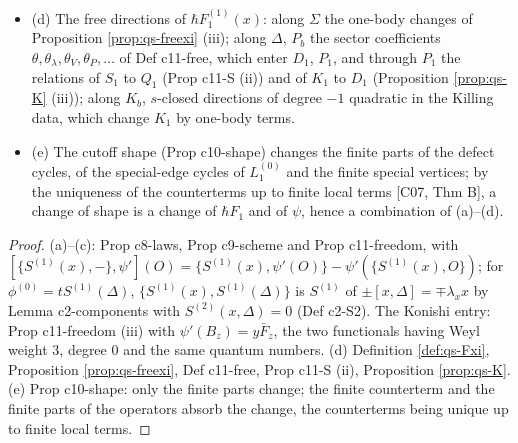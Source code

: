 \begin{proposition}
\begin{itemize}
\item (d) The free directions of $\hbar F_1^{(1)}(x)$: along $\Sigma$ the one-body changes of Proposition \ref{prop:qs-freexi} (iii); along $\Delta$, $P_b$ the sector coefficients $\theta,\theta_\lambda,\theta_V,\theta_P,\dots$ of Def c11-free, which enter $D_1$, $P_1$, and through $P_1$ the relations of $S_1$ to $Q_1$ (Prop c11-S (ii)) and of $K_1$ to $D_1$ (Proposition \ref{prop:qs-K} (iii)); along $K_b$, $s$-closed directions of degree $-1$ quadratic in the Killing data, which change $K_1$ by one-body terms.
\item (e) The cutoff shape (Prop c10-shape) changes the finite parts of the defect cycles, of the special-edge cycles of $L_1^{(0)}$ and the finite special vertices; by the uniqueness of the counterterms up to finite local terms [C07, Thm B], a change of shape is a change of $\hbar F_1$ and of $\psi$, hence a combination of (a)--(d).
\end{itemize}
\end{proposition}

\begin{proof}
(a)--(c): Prop c8-laws, Prop c9-scheme and Prop c11-freedom, with $[\{S^{(1)}(x),-\},\psi'](O)=\{S^{(1)}(x),\psi'(O)\}-\psi'(\{S^{(1)}(x),O\})$; for $\phi^{(0)}=tS^{(1)}(\Delta)$, $\{S^{(1)}(x),S^{(1)}(\Delta)\}$ is $S^{(1)}$ of $\pm[x,\Delta]=\mp\lambda_xx$ by Lemma c2-components with $S^{(2)}(x,\Delta)=0$ (Def c2-S2). The Konishi entry: Prop c11-freedom (iii) with $\psi'(B_z)=y\bar F_z$, the two functionals having Weyl weight $3$, degree $0$ and the same quantum numbers. (d) Definition \ref{def:qs-Fxi}, Proposition \ref{prop:qs-freexi}, Def c11-free, Prop c11-S (ii), Proposition \ref{prop:qs-K}. (e) Prop c10-shape: only the finite parts change; the finite counterterm and the finite parts of the operators absorb the change, the counterterms being unique up to finite local terms.
\end{proof}

